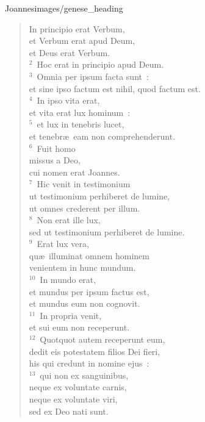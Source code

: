 {Joannes}{images/genese_heading}

\begin{flushleft}\begin{verse}\vspace{-11pt}In principio erat Verbum,\\ et Verbum erat apud Deum,\\ et Deus erat Verbum.\\
${}^{2}$~Hoc erat in principio apud Deum.\\
${}^{3}$~Omnia per ipsum facta sunt~:\\ et sine ipso factum est nihil, quod factum est.\\
${}^{4}$~In ipso vita erat,\\ et vita erat lux hominum~:\\
${}^{5}$~et lux in tenebris lucet,\\ et tenebr\ae\ eam non comprehenderunt.\\
${}^{6}$~Fuit homo\\ missus a Deo,\\ cui nomen erat Joannes.\\
${}^{7}$~Hic venit in testimonium\\ ut testimonium perhiberet de lumine,\\ ut omnes crederent per illum.\\
${}^{8}$~Non erat ille lux,\\ sed ut testimonium perhiberet de lumine.\\
${}^{9}$~Erat lux vera,\\ qu\ae\ illuminat omnem hominem\\ venientem in hunc mundum.\\
${}^{10}$~In mundo erat,\\ et mundus per ipsum factus est,\\ et mundus eum non cognovit.\\
${}^{11}$~In propria venit,\\ et sui eum non receperunt.\\
${}^{12}$~Quotquot autem receperunt eum,\\ dedit eis potestatem filios Dei fieri,\\ his qui credunt in nomine ejus~:\\
${}^{13}$~qui non ex sanguinibus,\\ neque ex voluntate carnis,\\ neque ex voluntate viri,\\ sed ex Deo nati sunt.\\

\end{verse}
\end{flushleft}

